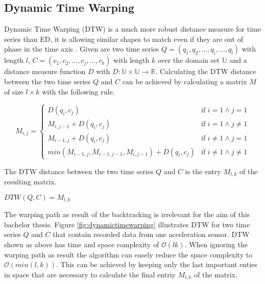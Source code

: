 \subsection{Dynamic Time Warping}
Dynamic Time Warping (DTW) is a much more robust distance measure for time series than ED, it is allowing
similar shapes to match even if they are out of phase in the time axis \cite{keogh2002exact}. Given are two time series
$Q = (q_1, q_2, \dots, q_i, \dots, q_l)$ with length $l$, $C = (c_1, c_2, \dots, c_j, \dots, c_k)$ with length $k$ over
the domain set $\mathbb{U}$ and a distance measure function $D$ with $D: \mathbb{U} \times \mathbb{U} \to \mathbb{R}$.
Calculating the DTW distance between the two time series $Q$ and $C$ can be achieved by calculating a matrix $M$ of size
$l \times k$ with the following rule.
\begin{center} \[ M_{i, j} = \begin{cases}
    D(q_i,c_j) & \text{if } i = 1 \wedge j = 1\\
    M_{i,j-1} + D(q_i,c_j) & \text{if } i = 1 \wedge j \neq 1\\
    M_{i-1,j} + D(q_i,c_j) & \text{if } i \neq 1 \wedge j = 1\\
    min(M_{i-1,j}, M_{i-1,j-1}, M_{i,j-1}) + D(q_i,c_j) & \text{if } i \neq 1 \wedge j \neq 1
\end{cases} \] \end{center}
The DTW distance between the two time series $Q$ and $C$ is the entry $M_{l,k}$ of the resulting matrix.
\begin{center}
    $DTW(Q, C) = M_{l,k}$
\end{center}
The warping path as result of the backtracking is irrelevant for the aim of this bachelor thesis. Figure
\ref{fig:dynamictimewarping} illustrates DTW for two time series $Q$ and $C$ that contain recorded data from one
acceleration sensor. DTW shown as above has time and space complexity of $\mathcal{O}(lk)$. When ignoring the
warping path as result the algorithm can easely reduce the space complexity to $\mathcal{O}(min(l, k))$. This can be
achieved by keeping only the last important enties in space that are necessary to calculate the final entriy $M_{l,k}$
of the matrix.

